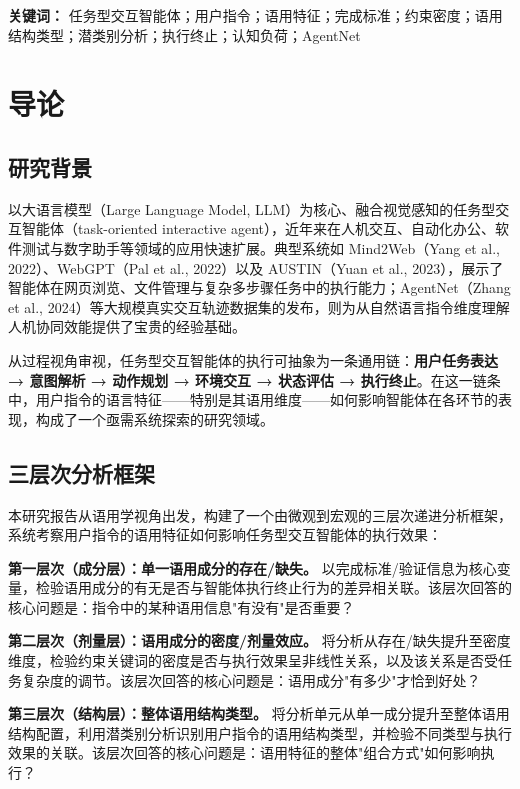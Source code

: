 \documentclass[12pt,a4paper,openany,oneside]{ctexrep}
\begin{document}
\textbf{关键词：} 任务型交互智能体；用户指令；语用特征；完成标准；约束密度；语用结构类型；潜类别分析；执行终止；认知负荷；AgentNet


\newpage

\newpage

\newpage

\chapter{导论}


\section{研究背景}


以大语言模型（Large Language Model, LLM）为核心、融合视觉感知的任务型交互智能体（task-oriented interactive agent），近年来在人机交互、自动化办公、软件测试与数字助手等领域的应用快速扩展。典型系统如 Mind2Web（Yang et al., 2022）、WebGPT（Pal et al., 2022）以及 AUSTIN（Yuan et al., 2023），展示了智能体在网页浏览、文件管理与复杂多步骤任务中的执行能力；AgentNet（Zhang et al., 2024）等大规模真实交互轨迹数据集的发布，则为从自然语言指令维度理解人机协同效能提供了宝贵的经验基础。

从过程视角审视，任务型交互智能体的执行可抽象为一条通用链：\textbf{用户任务表达 → 意图解析 → 动作规划 → 环境交互 → 状态评估 → 执行终止}。在这一链条中，用户指令的语言特征——特别是其语用维度——如何影响智能体在各环节的表现，构成了一个亟需系统探索的研究领域。

\section{三层次分析框架}


本研究报告从语用学视角出发，构建了一个由微观到宏观的三层次递进分析框架，系统考察用户指令的语用特征如何影响任务型交互智能体的执行效果：

\textbf{第一层次（成分层）：单一语用成分的存在/缺失。} 以完成标准/验证信息为核心变量，检验语用成分的有无是否与智能体执行终止行为的差异相关联。该层次回答的核心问题是：指令中的某种语用信息"有没有"是否重要？

\textbf{第二层次（剂量层）：语用成分的密度/剂量效应。} 将分析从存在/缺失提升至密度维度，检验约束关键词的密度是否与执行效果呈非线性关系，以及该关系是否受任务复杂度的调节。该层次回答的核心问题是：语用成分"有多少"才恰到好处？

\textbf{第三层次（结构层）：整体语用结构类型。} 将分析单元从单一成分提升至整体语用结构配置，利用潜类别分析识别用户指令的语用结构类型，并检验不同类型与执行效果的关联。该层次回答的核心问题是：语用特征的整体"组合方式"如何影响执行？
\end{document}
